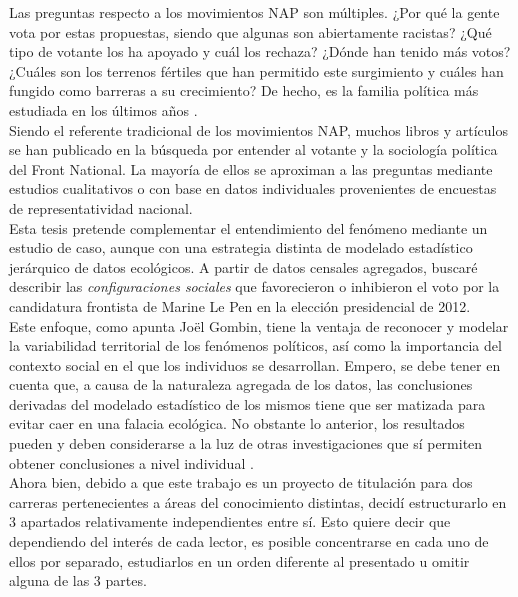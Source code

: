 Las preguntas respecto a los movimientos NAP son múltiples. ¿Por qué la gente vota por estas propuestas, siendo que algunas son abiertamente racistas? ¿Qué tipo de votante los ha apoyado y cuál los rechaza? ¿Dónde han tenido más votos? ¿Cuáles son los terrenos fértiles que han permitido este surgimiento y cuáles han fungido como barreras a su crecimiento? De hecho, es la familia política más estudiada en los últimos años \parencite{Mudde16}.\\ 

Siendo el referente tradicional de los movimientos NAP, muchos libros y artículos se han publicado en la búsqueda por entender al votante y la sociología política del Front National. La mayoría de ellos se aproximan a las preguntas mediante estudios cualitativos o con base en datos individuales provenientes de encuestas de representatividad nacional.\\ 

Esta tesis pretende complementar el entendimiento del fenómeno mediante un estudio de caso, aunque con una estrategia distinta de modelado estadístico jerárquico de datos ecológicos. A partir de datos censales agregados, buscaré describir las \textit{configuraciones sociales} que favorecieron o inhibieron el voto por la candidatura frontista de Marine Le Pen en la elección presidencial de 2012.\\

Este enfoque, como apunta Joël Gombin, tiene la ventaja de reconocer y modelar la variabilidad territorial de los fenómenos políticos, así como la importancia del contexto social en el que los individuos se desarrollan. Empero, se debe tener en cuenta que, a causa de la naturaleza agregada de los datos, las conclusiones derivadas del modelado estadístico de los mismos tiene que ser matizada para evitar caer en una falacia ecológica. No obstante lo anterior, los resultados pueden y deben considerarse a la luz de otras investigaciones que sí permiten obtener conclusiones a nivel individual \parencite{Gombin05}.\\ 

Ahora bien, debido a que este trabajo es un proyecto de titulación para dos carreras pertenecientes a áreas del conocimiento distintas, decidí estructurarlo en 3 apartados relativamente independientes entre sí. Esto quiere decir que dependiendo del interés de cada lector, es posible concentrarse en cada uno de ellos por separado, estudiarlos en un orden diferente al presentado u omitir alguna de las 3 partes.\\ 

